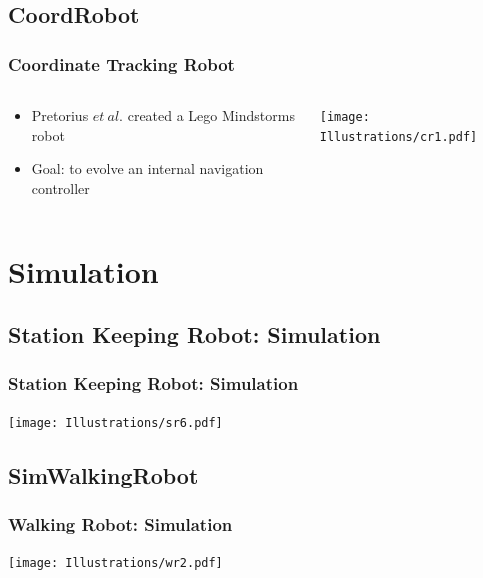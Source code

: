 \documentclass{beamer}
\begin{document}
\subsection{CoordRobot}
\begin{frame}
  \frametitle{Coordinate Tracking Robot}
\begin{columns}
  \begin{column}{0.5\textwidth}
\begin{itemize}
\item  Pretorius $et~al.$ created a Lego Mindstorms robot
\item Goal: to evolve an internal navigation controller
\end{itemize}
\end{column}
\begin{column}{0.5\textwidth}
 \texttt{[image: Illustrations/cr1.pdf]}
       \\
\end{column}
\end{columns}
\end{frame}

\section{Simulation}

\subsection{Station Keeping Robot: Simulation}
\begin{frame}
  \frametitle{Station Keeping Robot: Simulation}
\begin{center}
 \texttt{[image: Illustrations/sr6.pdf]}
       \\
\end{center}
\end{frame}

\subsection{SimWalkingRobot}
\begin{frame}
  \frametitle{Walking Robot: Simulation}
\begin{center}
 \texttt{[image: Illustrations/wr2.pdf]}
       \\
\end{center}
\end{frame}
\end{document}

